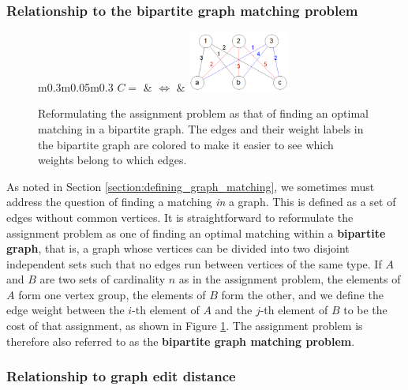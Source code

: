 \documentclass[12pt]{thesis}
\theoremstyle{plain}
\theoremstyle{definition}
\theoremstyle{remark}
\begin{document}
\subsubsection{Relationship to the bipartite graph matching problem}

\begin{figure}[h]
\centering
\begin{tabular}{m{}m{}m{}}
$C = $
 & $\Leftrightarrow$ &
\includegraphics[width=0.3\textwidth]{bipartite_assignment_problem.png} \\
\end{tabular}
\caption{Reformulating the assignment problem as that of finding an optimal matching in a bipartite graph. The edges and their weight labels in the bipartite graph are colored to make it easier to see which weights belong to which edges.}
\label{bipartite_reformulation}
\end{figure}

As noted in Section \ref{section:defining_graph_matching}, we sometimes must address the question of finding a matching \textit{in} a graph. This is defined as a set of edges without common vertices. It is straightforward to reformulate the assignment problem as one of finding an optimal matching within a \textbf{bipartite graph}, that is, a graph whose vertices can be divided into two disjoint independent sets such that no edges run between vertices of the same type. If $A$ and $B$ are two sets of cardinality $n$ as in the assignment problem, the elements of $A$ form one vertex group, the elements of $B$ form the other, and we define the edge weight between the $i$-th element of $A$ and the $j$-th element of $B$ to be the cost of that assignment, as shown in Figure \ref{bipartite_reformulation}. The assignment problem is therefore also referred to as the \textbf{bipartite graph matching problem}.

\subsubsection{Relationship to graph edit distance}
\end{document}

